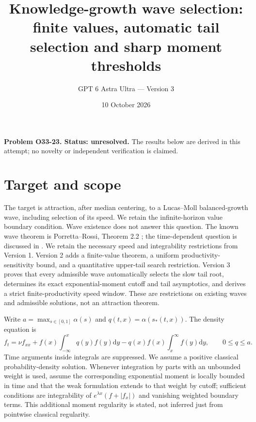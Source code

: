 \documentclass[11pt]{article}
\title{Knowledge-growth wave selection:\\finite values, automatic tail selection and sharp moment thresholds}
\author{GPT 6 Astra Ultra --- Version 3}
\date{10 October 2026}
\newcommand{\dd}{\mathrm d}
\begin{document}
\maketitle
\noindent\textbf{Problem O33-23. Status: unresolved.} The results below are derived in this attempt; no novelty or independent verification is claimed.

\section{Target and scope}
The target is attraction, after median centering, to a Lucas--Moll balanced-growth wave, including selection of its speed. We retain the infinite-horizon value boundary condition. Wave existence does not answer this question. The known wave theorem is Porretta--Rossi, Theorem 2.2 \cite{PR}; the time-dependent question is discussed in \cite[Section 3.3]{CD}. We retain the necessary speed and integrability restrictions from Version 1. Version 2 adds a finite-value theorem, a uniform productivity-sensitivity bound, and a quantitative upper-tail search restriction. Version 3 proves that every admissible wave automatically selects the slow tail root, determines its exact exponential-moment cutoff and tail asymptotics, and derives a strict finite-productivity speed window. These are restrictions on existing waves and admissible solutions, not an attraction theorem.

Write $a=\max_{s\in[0,1]}\alpha(s)$ and $q(t,x)=\alpha(s_*(t,x))$. The density equation is
\begin{equation}\label{density}
 f_t=\nu f_{xx}+f(x)\int_{-\infty}^x q(y)f(y)\dd y-q(x)f(x)\int_x^\infty f(y)\dd y,
 \qquad 0\le q\le a.
\end{equation}
Time arguments inside integrals are suppressed. We assume a positive classical probability-density solution. Whenever integration by parts with an unbounded weight is used, assume the corresponding exponential moment is locally bounded in time and that the weak formulation extends to that weight by cutoff; sufficient conditions are integrability of $e^{\lambda x}(f+|f_x|)$ and vanishing weighted boundary terms. This additional moment regularity is stated, not inferred just from pointwise classical regularity.
\end{document}
